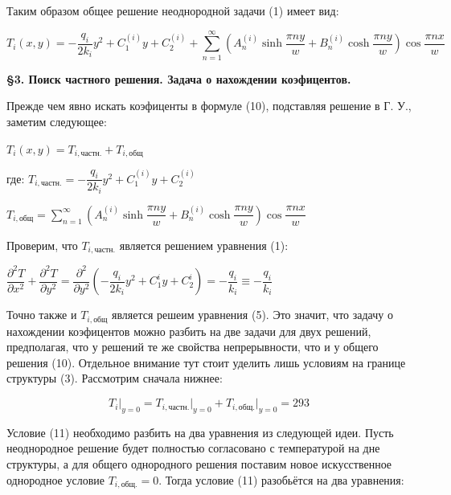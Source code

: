 \documentclass[a4paper,12pt]{article}
\begin{document}
	  
	\quad Таким образом общее решение неоднородной задачи (1) имеет вид: 
	
	\begin{equation}
		T_i(x, y)  = -\dfrac{q_i }{2k_i} y^2 + C^{(i)}_1 y + C^{(i)}_2 + \displaystyle\sum\limits_{n=1}^{\infty} \left(A^{(i)}_n \sinh{\dfrac{\pi n y}{w}}+ B^{(i)}_n \cosh{\dfrac{\pi n y}{w}} \right) \cos{\dfrac{\pi n x}{w}}
	\end{equation}
	
	\quad \textbf{\S3. Поиск частного решения. Задача о нахождении коэфицентов.}
	
	\quad Прежде чем явно искать коэфиценты в формуле (10), подставляя решение в Г. У., заметим следующее: 
	
	\begin{center}
		$T_i (x, y) = T_{i,\text{частн.}} + T_{i,\text{общ}}$
		
		где: $T_{i,\text{частн.}} = -\dfrac{q_i}{2k_i} y^2 + C^{(i)}_1 y + C^{(i)}_2$
		
		$T_{i,\text{общ}} = \displaystyle\sum\limits_{n=1}^{\infty} \left(A^{(i)}_n \sinh{\dfrac{\pi n y}{w}}+ B^{(i)}_n \cosh{\dfrac{\pi n y}{w}} \right) \cos{\dfrac{\pi n x}{w}}$
	\end{center}
	
	\quad Проверим, что $T_{i,\text{частн.}}$ является решением уравнения (1): 
	
	\begin{center}
		$\dfrac{\partial^2 T}{\partial x^2 } + \dfrac{\partial^2 T}{\partial y^2} = \dfrac{\partial^2 }{\partial y^2 } \left( -\dfrac{q_i}{2k_i} y^2 + C^{i}_1 y + C^{i}_2\right) = -\dfrac{q_i}{k_i} \equiv -\dfrac{q_i}{k_i}$
	\end{center}
	
	\quad Точно также и $T_{i,\text{общ}}$ является решеим уравнения (5). Это значит, что задачу о нахождении коэфицентов можно разбить на две задачи для двух решений, предполагая, что у решений те же свойства непрерывности, что и у общего решения (10). Отдельное внимание тут стоит уделить лишь условиям на границе структуры (3). Рассмотрим сначала нижнее:
	
	\begin{equation}
		T_{i} \bigg|_{y=0} = T_{i,\text{частн.}} \bigg|_{y=0} + T_{i, \text{общ.}}\bigg|_{y=0} = 293
	\end{equation}
	
	\quad Условие (11) необходимо разбить на два уравнения из следующей идеи. Пусть неоднородное решение будет полностью согласовано с температурой на дне структуры, а для общего однородного решения поставим новое искусственное однородное условие $T_{i, \text{общ.}} = 0$. Тогда условие (11) разобьётся на два уравнения:
	
\end{document}
